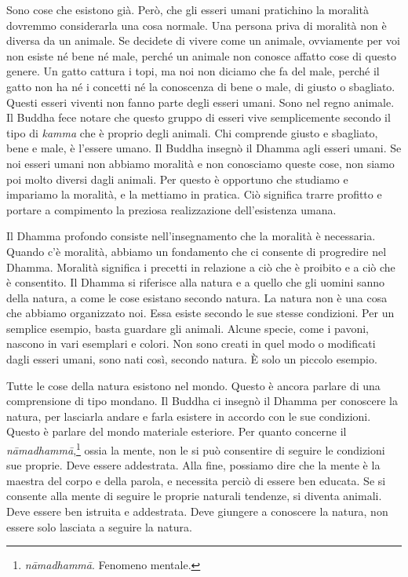 Sono cose che esistono già. Però, che gli esseri umani pratichino la
moralità dovremmo considerarla una cosa normale. Una persona priva di
moralità non è diversa da un animale. Se decidete di vivere come un
animale, ovviamente per voi non esiste né bene né male, perché un
animale non conosce affatto cose di questo genere. Un gatto cattura i
topi, ma noi non diciamo che fa del male, perché il gatto non ha né i
concetti né la conoscenza di bene o male, di giusto o sbagliato. Questi
esseri viventi non fanno parte degli esseri umani. Sono nel regno
animale. Il Buddha fece notare che questo gruppo di esseri vive
semplicemente secondo il tipo di \emph{kamma} che è proprio degli
animali. Chi comprende giusto e sbagliato, bene e male, è l'essere
umano. Il Buddha insegnò il Dhamma agli esseri umani. Se noi esseri
umani non abbiamo moralità e non conosciamo queste cose, non siamo poi
molto diversi dagli animali. Per questo è opportuno che studiamo e
impariamo la moralità, e la mettiamo in pratica. Ciò significa trarre
profitto e portare a compimento la preziosa realizzazione dell'esistenza
umana.

Il Dhamma profondo consiste nell'insegnamento che la moralità è
necessaria. Quando c'è moralità, abbiamo un fondamento che ci consente
di progredire nel Dhamma. Moralità significa i precetti in relazione a
ciò che è proibito e a ciò che è consentito. Il Dhamma si riferisce alla
natura e a quello che gli uomini sanno della natura, a come le cose
esistano secondo natura. La natura non è una cosa che abbiamo
organizzato noi. Essa esiste secondo le sue stesse condizioni. Per un
semplice esempio, basta guardare gli animali. Alcune specie, come i
pavoni, nascono in vari esemplari e colori. Non sono creati in quel modo
o modificati dagli esseri umani, sono nati così, secondo natura. È solo
un piccolo esempio.

Tutte le cose della natura esistono nel mondo. Questo è ancora parlare
di una comprensione di tipo mondano. Il Buddha ci insegnò il Dhamma per
conoscere la natura, per lasciarla andare e farla esistere in accordo
con le sue condizioni. Questo è parlare del mondo materiale esteriore.
Per quanto concerne il \emph{nāmadhammā},\footnote{\emph{nāmadhammā}.
  Fenomeno mentale.} ossia la mente, non le si può consentire di seguire
le condizioni sue proprie. Deve essere addestrata. Alla fine, possiamo
dire che la mente è la maestra del corpo e della parola, e necessita
perciò di essere ben educata. Se si consente alla mente di seguire le
proprie naturali tendenze, si diventa animali. Deve essere ben istruita
e addestrata. Deve giungere a conoscere la natura, non essere solo
lasciata a seguire la natura.

